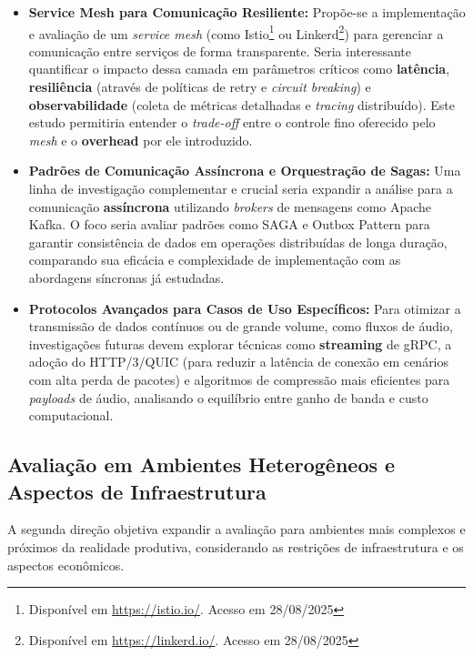 \begin{itemize}
    \item \textbf{Service Mesh para Comunicação Resiliente:} Propõe-se a implementação e avaliação de um \textit{service mesh} (como Istio\footnote{Disponível em \hyperlink{https://istio.io/}{https://istio.io/}. Acesso em 28/08/2025} ou Linkerd\footnote{Disponível em \hyperlink{https://linkerd.io/}{https://linkerd.io/}. Acesso em 28/08/2025}) para gerenciar a comunicação entre serviços de forma transparente. Seria interessante quantificar o impacto dessa camada em parâmetros críticos como \textbf{latência}, \textbf{resiliência} (através de políticas de retry e \textit{circuit breaking}) e \textbf{observabilidade} (coleta de métricas detalhadas e \textit{tracing} distribuído). Este estudo permitiria entender o \textit{trade-off} entre o controle fino oferecido pelo \textit{mesh} e o \textbf{overhead} por ele introduzido.
    
    \item \textbf{Padrões de Comunicação Assíncrona e Orquestração de Sagas:} Uma linha de investigação complementar e crucial seria expandir a análise para a comunicação \textbf{assíncrona} utilizando \textit{brokers} de mensagens como Apache Kafka. O foco seria avaliar padrões como SAGA e Outbox Pattern para garantir consistência de dados em operações distribuídas de longa duração, comparando sua eficácia e complexidade de implementação com as abordagens síncronas já estudadas.
    
    \item \textbf{Protocolos Avançados para Casos de Uso Específicos:} Para otimizar a transmissão de dados contínuos ou de grande volume, como fluxos de áudio, investigações futuras devem explorar técnicas como \textbf{streaming} de gRPC, a adoção do HTTP/3/QUIC (para reduzir a latência de conexão em cenários com alta perda de pacotes) e algoritmos de compressão mais eficientes para \textit{payloads} de áudio, analisando o equilíbrio entre ganho de banda e custo computacional.
\end{itemize}

\subsection{Avaliação em Ambientes Heterogêneos e Aspectos de Infraestrutura}

A segunda direção objetiva expandir a avaliação para ambientes mais complexos e próximos da realidade produtiva, considerando as restrições de infraestrutura e os aspectos econômicos.

